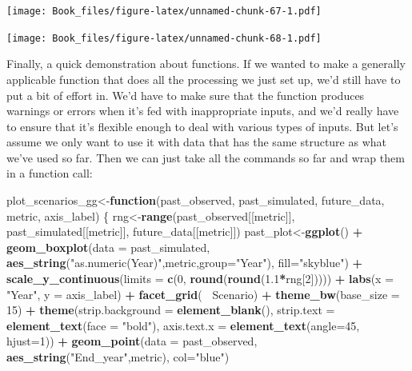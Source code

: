\documentclass[
]{book}
\newenvironment{Shaded}{\begin{snugshade}}{\end{snugshade}}
\newcommand{\ControlFlowTok}[1]{\textcolor[rgb]{0.13,0.29,0.53}{\textbf{#1}}}
\newcommand{\DataTypeTok}[1]{\textcolor[rgb]{0.13,0.29,0.53}{#1}}
\newcommand{\DecValTok}[1]{\textcolor[rgb]{0.00,0.00,0.81}{#1}}
\newcommand{\FloatTok}[1]{\textcolor[rgb]{0.00,0.00,0.81}{#1}}
\newcommand{\KeywordTok}[1]{\textcolor[rgb]{0.13,0.29,0.53}{\textbf{#1}}}
\newcommand{\NormalTok}[1]{#1}
\newcommand{\OperatorTok}[1]{\textcolor[rgb]{0.81,0.36,0.00}{\textbf{#1}}}
\newcommand{\StringTok}[1]{\textcolor[rgb]{0.31,0.60,0.02}{#1}}
\begin{document}
\texttt{[image: Book\_files/figure-latex/unnamed-chunk-67-1.pdf]}

\texttt{[image: Book\_files/figure-latex/unnamed-chunk-68-1.pdf]}

Finally, a quick demonstration about functions. If we wanted to make a generally applicable function that does all the processing we just set up, we'd still have to put a bit of effort in. We'd have to make sure that the function produces warnings or errors when it's fed with inappropriate inputs, and we'd really have to ensure that it's flexible enough to deal with various types of inputs. But let's assume we only want to use it with data that has the same structure as what we've used so far. Then we can just take all the commands so far and wrap them in a function call:

\begin{Shaded}
\begin{Highlighting}[]
\NormalTok{plot_scenarios_gg<-}\ControlFlowTok{function}\NormalTok{(past_observed,}
\NormalTok{                            past_simulated,}
\NormalTok{                            future_data,}
\NormalTok{                            metric,}
\NormalTok{                            axis_label)}
\NormalTok{\{}
\NormalTok{  rng<-}\KeywordTok{range}\NormalTok{(past_observed[[metric]],}
\NormalTok{             past_simulated[[metric]],}
\NormalTok{             future_data[[metric]])  }
\NormalTok{  past_plot<-}\KeywordTok{ggplot}\NormalTok{() }\OperatorTok{+}
\StringTok{    }\KeywordTok{geom_boxplot}\NormalTok{(}\DataTypeTok{data =}\NormalTok{ past_simulated,}
                 \KeywordTok{aes_string}\NormalTok{(}\StringTok{"as.numeric(Year)"}\NormalTok{,metric,}\DataTypeTok{group=}\StringTok{"Year"}\NormalTok{),}
                 \DataTypeTok{fill=}\StringTok{"skyblue"}\NormalTok{) }\OperatorTok{+}
\StringTok{    }\KeywordTok{scale_y_continuous}\NormalTok{(}\DataTypeTok{limits =} \KeywordTok{c}\NormalTok{(}\DecValTok{0}\NormalTok{, }\KeywordTok{round}\NormalTok{(}\KeywordTok{round}\NormalTok{(}\FloatTok{1.1}\OperatorTok{*}\NormalTok{rng[}\DecValTok{2}\NormalTok{])))) }\OperatorTok{+}
\StringTok{    }\KeywordTok{labs}\NormalTok{(}\DataTypeTok{x =} \StringTok{"Year"}\NormalTok{, }\DataTypeTok{y =}\NormalTok{ axis_label) }\OperatorTok{+}
\StringTok{    }\KeywordTok{facet_grid}\NormalTok{(}\OperatorTok{~}\StringTok{ }\NormalTok{Scenario) }\OperatorTok{+}
\StringTok{    }\KeywordTok{theme_bw}\NormalTok{(}\DataTypeTok{base_size =} \DecValTok{15}\NormalTok{) }\OperatorTok{+}\StringTok{  }
\StringTok{    }\KeywordTok{theme}\NormalTok{(}\DataTypeTok{strip.background =} \KeywordTok{element_blank}\NormalTok{(),}
          \DataTypeTok{strip.text =} \KeywordTok{element_text}\NormalTok{(}\DataTypeTok{face =} \StringTok{"bold"}\NormalTok{),}
          \DataTypeTok{axis.text.x =} \KeywordTok{element_text}\NormalTok{(}\DataTypeTok{angle=}\DecValTok{45}\NormalTok{, }\DataTypeTok{hjust=}\DecValTok{1}\NormalTok{)) }\OperatorTok{+}
\StringTok{    }\KeywordTok{geom_point}\NormalTok{(}\DataTypeTok{data =}\NormalTok{ past_observed,}
               \KeywordTok{aes_string}\NormalTok{(}\StringTok{"End_year"}\NormalTok{,metric),}
               \DataTypeTok{col=}\StringTok{"blue"}\NormalTok{)}
  

\end{Highlighting}
\end{Shaded}
\end{document}
